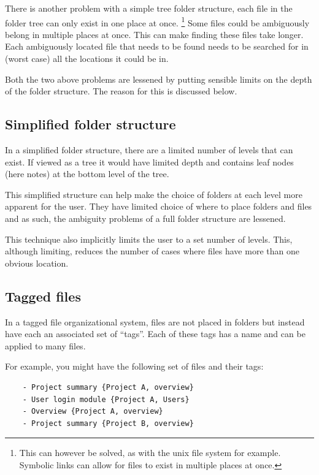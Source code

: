 There is another problem with a simple tree folder structure, each file in the
folder tree can only exist in one place at once.%
%
\footnote{This can however be solved, as with the unix file system for example.
Symbolic links can allow for files to exist in multiple places at once. }
Some files could be ambiguously belong in multiple places at once. This can make
finding these files take longer. Each ambiguously located file that needs to be
found needs to be searched for in (worst case) all the locations it could be in.

Both the two above problems are lessened by putting sensible limits on
the depth of the folder structure. The reason for this is discussed
below.

\subsection{Simplified folder structure}\label{simplified-folder-structure}

In a simplified folder structure, there are a limited number of levels that can
exist. If viewed as a tree it would have limited depth and contains leaf nodes
(here notes) at the bottom level of the tree.

This simplified structure can help make the choice of folders at each
level more apparent for the user. They have limited choice of
where to place folders and files and as such, the ambiguity problems of a
full folder structure are lessened.

This technique also implicitly limits the user to a set number of
levels. This, although limiting, reduces the number of cases where files have
 more than one obvious location.

\subsection{Tagged files}\label{tagged-files}

In a tagged file organizational system, files are not placed in folders
but instead have each an associated set of ``tags''. Each of these tags
has a name and can be applied to many files.

For example, you might have the following set of files and their tags:

\begin{verbatim}
    - Project summary {Project A, overview}
    - User login module {Project A, Users}
    - Overview {Project A, overview}
    - Project summary {Project B, overview}
\end{verbatim}

